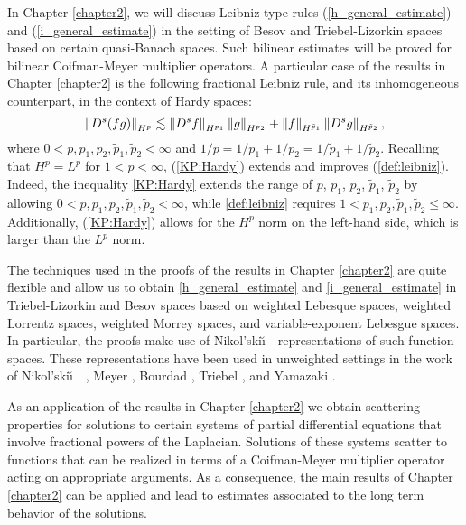 In Chapter \ref{chapter2}, we will discuss Leibniz-type rules (\ref{h_general_estimate}) and (\ref{i_general_estimate}) in the setting of Besov and Triebel-Lizorkin spaces based on certain quasi-Banach spaces. Such bilinear estimates will be proved for bilinear Coifman-Meyer multiplier operators. A particular case of the results in Chapter \ref{chapter2} is the following fractional Leibniz rule, and its inhomogeneous counterpart, in the context of Hardy spaces:
\begin{equation}\label{KP:Hardy}
\left\|D^s(fg)\right\|_{H^p} \lesssim \left\|D^s f\right\|_{H^{p_1}} \left\|g\right\|_{H^{p_2}} +  \left\|f\right\|_{H^{\tilde{p}_1}}   \left\|D^s g\right\|_{H^{\tilde{p}_2}}, 
\end{equation}
where $0<p,p_1, p_2,\tilde{p}_1, \tilde{p}_2 <\infty$ and $1/p = 1/p_1 + 1/p_2 = 1/\tilde{p}_1 + 1/\tilde{p}_2$. Recalling that $H^p = L^p$ for $1<p<\infty$, (\ref{KP:Hardy}) extends and improves (\ref{def:leibniz}). Indeed, the inequality \eqref{KP:Hardy} extends the range of $p$, $p_1$, $p_2$, $\tilde{p}_1$, $\tilde{p}_2$ by allowing $0<p,p_1,p_2,\tilde{p}_1,\tilde{p}_2<\infty$, while \eqref{def:leibniz} requires $1<p_1,p_2,\tilde{p}_1, \tilde{p}_2\leq \infty$. Additionally, (\ref{KP:Hardy}) allows for the $H^p$ norm on the left-hand side, which is larger than the $L^p$ norm. 
  
The techniques used in the proofs of the results in Chapter \ref{chapter2} are quite flexible and allow us to obtain \eqref{h_general_estimate} and \eqref{i_general_estimate} in Triebel-Lizorkin and Besov spaces based on weighted Lebesque spaces, weighted Lorrentz spaces, weighted Morrey spaces, and variable-exponent Lebesgue spaces.
In particular, the proofs make use of Nikol'ski\u\i$\text{ }$  representations of such function spaces. These representations have been used in unweighted settings in the work of Nikol'ski\u\i$\text{ }$  \citep{MR0374877}, Meyer \citep{MR639462}, Bourdad \citep{MR673825}, Triebel \citep{MR3024598}, and Yamazaki \citep{MR837335}. 

As an application of the results in Chapter \ref{chapter2} we obtain scattering properties for solutions to certain systems of partial differential equations that involve fractional powers of the Laplacian. Solutions of these systems scatter to functions that can be realized in terms of a Coifman-Meyer multiplier operator acting on appropriate arguments. As a consequence, the main results of Chapter \ref{chapter2} can be applied and lead to estimates associated to the long term behavior of the solutions. 

